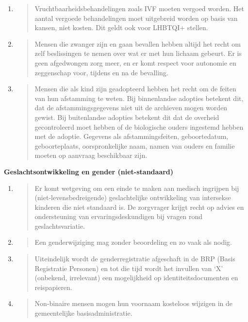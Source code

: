 \begin{enumerate}
\def\labelenumi{\arabic{enumi}.}
\item
  \begin{quote}
  Vruchtbaarheidsbehandelingen zoals IVF moeten vergoed worden. Het
  aantal vergoede behandelingen moet uitgebreid worden op basis van
  kansen, niet kosten. Dit geldt ook voor LHBTQI+ stellen.
  \end{quote}
\item
  \begin{quote}
  Mensen die zwanger zijn en gaan bevallen hebben altijd het recht om
  zelf beslissingen te nemen over wat er met hun lichaam gebeurt. Er is
  geen afgedwongen zorg meer, en er komt respect voor autonomie en
  zeggenschap voor, tijdens en na de bevalling.
  \end{quote}
\item
  \begin{quote}
  Mensen die als kind zijn geadopteerd hebben het recht om de feiten van
  hun afstamming te weten. Bij binnenlandse adopties betekent dit, dat
  de afstammingsgegevens niet uit de archieven mogen worden gewist. Bij
  buitenlandse adopties betekent dit dat de overheid gecontroleerd moet
  hebben of de biologische ouders ingestemd hebben met de adoptie.
  Gegevens als afstammingsfeiten, geboortedatum, geboorteplaats,
  oorspronkelijke naam, namen van ouders en familie moeten op aanvraag
  beschikbaar zijn.
  \end{quote}
\end{enumerate}

\textbf{Geslachtsontwikkeling en gender (niet-standaard)}

\begin{enumerate}
\def\labelenumi{\arabic{enumi}.}
\item
  \begin{quote}
  Er komt wetgeving om een einde te maken aan medisch ingrijpen bij
  (niet-levensbedreigende) geslachtelijke ontwikkeling van intersekse
  kinderen die niet standaard is. De zorgvrager krijgt recht op advies
  en ondersteuning van ervaringsdeskundigen bij vragen rond
  geslachtsvariatie.
  \end{quote}
\item
  \begin{quote}
  Een genderwijziging mag zonder beoordeling en zo vaak als nodig.
  \end{quote}
\item
  \begin{quote}
  Uiteindelijk wordt de genderregistratie afgeschaft in de BRP (Basis
  Registratie Personen) en tot die tijd wordt het invullen van `X'
  (onbekend, irrelevant) een mogelijkheid op identiteitsdocumenten en
  reispapieren.
  \end{quote}
\item
  \begin{quote}
  Non-binaire mensen mogen hun voornaam kosteloos wijzigen in de
  gemeentelijke basisadministratie.
  \end{quote}
\end{enumerate}

